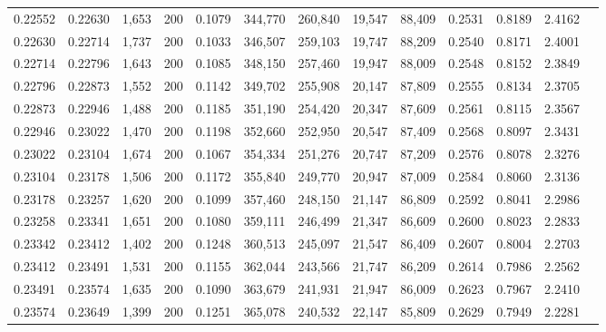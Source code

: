 \begin{tabular}{rrrrrrrrrrrrr}
0.22552 & 0.22630 &  1,653 & 200 &                                     0.1079 & 344,770 & 260,840 &  19,547 &  88,409 & 0.2531 & 0.8189 & 2.4162 \\
0.22630 & 0.22714 &  1,737 & 200 &                                     0.1033 & 346,507 & 259,103 &  19,747 &  88,209 & 0.2540 & 0.8171 & 2.4001 \\
0.22714 & 0.22796 &  1,643 & 200 &                                     0.1085 & 348,150 & 257,460 &  19,947 &  88,009 & 0.2548 & 0.8152 & 2.3849 \\
0.22796 & 0.22873 &  1,552 & 200 &                                     0.1142 & 349,702 & 255,908 &  20,147 &  87,809 & 0.2555 & 0.8134 & 2.3705 \\
0.22873 & 0.22946 &  1,488 & 200 &                                     0.1185 & 351,190 & 254,420 &  20,347 &  87,609 & 0.2561 & 0.8115 & 2.3567 \\
0.22946 & 0.23022 &  1,470 & 200 &                                     0.1198 & 352,660 & 252,950 &  20,547 &  87,409 & 0.2568 & 0.8097 & 2.3431 \\
0.23022 & 0.23104 &  1,674 & 200 &                                     0.1067 & 354,334 & 251,276 &  20,747 &  87,209 & 0.2576 & 0.8078 & 2.3276 \\
0.23104 & 0.23178 &  1,506 & 200 &                                     0.1172 & 355,840 & 249,770 &  20,947 &  87,009 & 0.2584 & 0.8060 & 2.3136 \\
0.23178 & 0.23257 &  1,620 & 200 &                                     0.1099 & 357,460 & 248,150 &  21,147 &  86,809 & 0.2592 & 0.8041 & 2.2986 \\
0.23258 & 0.23341 &  1,651 & 200 &                                     0.1080 & 359,111 & 246,499 &  21,347 &  86,609 & 0.2600 & 0.8023 & 2.2833 \\
0.23342 & 0.23412 &  1,402 & 200 &                                     0.1248 & 360,513 & 245,097 &  21,547 &  86,409 & 0.2607 & 0.8004 & 2.2703 \\
0.23412 & 0.23491 &  1,531 & 200 &                                     0.1155 & 362,044 & 243,566 &  21,747 &  86,209 & 0.2614 & 0.7986 & 2.2562 \\
0.23491 & 0.23574 &  1,635 & 200 &                                     0.1090 & 363,679 & 241,931 &  21,947 &  86,009 & 0.2623 & 0.7967 & 2.2410 \\
0.23574 & 0.23649 &  1,399 & 200 &                                     0.1251 & 365,078 & 240,532 &  22,147 &  85,809 & 0.2629 & 0.7949 & 2.2281 \\

\end{tabular}
